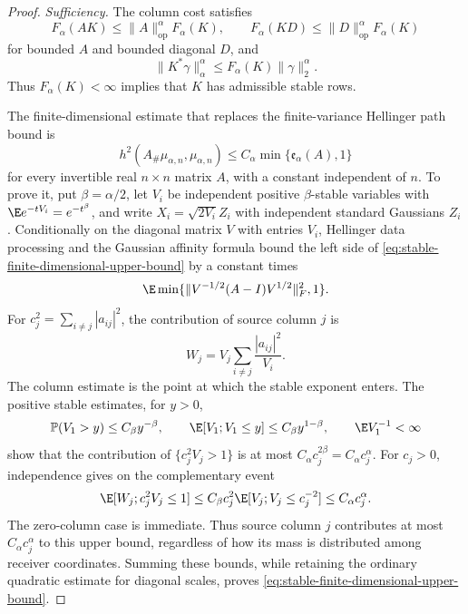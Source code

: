 \begin{proof}
\emph{Sufficiency.}
The column cost satisfies
\begin{equation}
 F_\alpha(AK)\le\|A\|_{\mathrm{op}}^\alpha F_\alpha(K),
 \qquad
 F_\alpha(KD)\le\|D\|_{\mathrm{op}}^\alpha F_\alpha(K)
 \label{eq:stable-column-class-bounds}
\end{equation}
for bounded \(A\) and bounded diagonal \(D\), and
\begin{equation}
 \|K^*\gamma\|_\alpha^\alpha
 \le F_\alpha(K)\|\gamma\|_2^\alpha.
 \label{eq:stable-row-admissibility-bound}
\end{equation}
Thus \(F_\alpha(K)<\infty\) implies that \(K\) has admissible stable rows.

The finite-dimensional estimate that replaces the finite-variance Hellinger
path bound is
\begin{equation}
 h^2(A_\#\mu_{\alpha,n},\mu_{\alpha,n})
 \le C_\alpha\min\{\mathfrak e_\alpha(A),1\}
 \label{eq:stable-finite-dimensional-upper-bound}
\end{equation}
for every invertible real \(n\times n\) matrix \(A\), with a constant
independent of \(n\).
To prove it, put \(\beta=\alpha/2\), let \(V_i\) be independent positive
\(\beta\)-stable variables with
\(\E e^{-tV_i}=e^{-t^\beta}\), and write
\(X_i=\sqrt{2V_i}Z_i\) with independent standard Gaussians \(Z_i\).
Conditionally on the diagonal matrix \(V\) with entries \(V_i\), Hellinger
data processing and the
Gaussian affinity formula bound the left side of
\eqref{eq:stable-finite-dimensional-upper-bound} by a constant times
\[
 \E\min\{\|V^{-1/2}(A-I)V^{1/2}\|_F^2,1\}.
\]
For \(c_j^2=\sum_{i\ne j}|a_{ij}|^2\), the contribution of source column
\(j\) is
\[
 W_j=V_j\sum_{i\ne j}\frac{|a_{ij}|^2}{V_i}.
\]
The column estimate is the point at which the stable exponent enters.  The
positive stable estimates, for \(y>0\),
\[
 \mathbb P(V_1>y)\le C_\beta y^{-\beta},
 \qquad
 \E[V_1;V_1\le y]\le C_\beta y^{1-\beta},
 \qquad
 \E V_1^{-1}<\infty
\]
show that the contribution of \(\{c_j^2V_j>1\}\) is at most
\(C_\alpha c_j^{2\beta}=C_\alpha c_j^\alpha\).  For \(c_j>0\), independence
gives on the complementary event
\[
 \E[W_j;c_j^2V_j\le1]
 \le C_\beta c_j^2\E[V_j;V_j\le c_j^{-2}]
 \le C_\alpha c_j^\alpha.
\]
The zero-column case is immediate.  Thus source column \(j\) contributes at
most \(C_\alpha c_j^\alpha\) to this upper bound, regardless of how its mass is
distributed among receiver coordinates.  Summing these bounds, while retaining
the ordinary quadratic estimate for diagonal scales, proves
\eqref{eq:stable-finite-dimensional-upper-bound}.


\end{proof}
